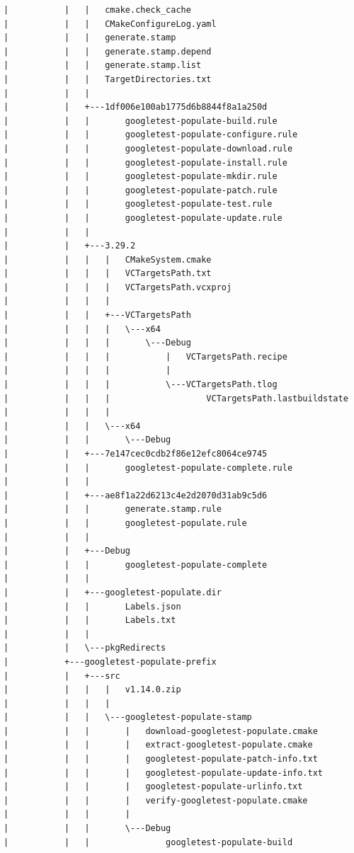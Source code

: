 \documentclass[12pt,a4paper]{article}
\begin{document}
\begin{verbatim}
|           |   |   cmake.check_cache
|           |   |   CMakeConfigureLog.yaml
|           |   |   generate.stamp
|           |   |   generate.stamp.depend
|           |   |   generate.stamp.list
|           |   |   TargetDirectories.txt
|           |   |   
|           |   +---1df006e100ab1775d6b8844f8a1a250d
|           |   |       googletest-populate-build.rule
|           |   |       googletest-populate-configure.rule
|           |   |       googletest-populate-download.rule
|           |   |       googletest-populate-install.rule
|           |   |       googletest-populate-mkdir.rule
|           |   |       googletest-populate-patch.rule
|           |   |       googletest-populate-test.rule
|           |   |       googletest-populate-update.rule
|           |   |       
|           |   +---3.29.2
|           |   |   |   CMakeSystem.cmake
|           |   |   |   VCTargetsPath.txt
|           |   |   |   VCTargetsPath.vcxproj
|           |   |   |   
|           |   |   +---VCTargetsPath
|           |   |   |   \---x64
|           |   |   |       \---Debug
|           |   |   |           |   VCTargetsPath.recipe
|           |   |   |           |   
|           |   |   |           \---VCTargetsPath.tlog
|           |   |   |                   VCTargetsPath.lastbuildstate
|           |   |   |                   
|           |   |   \---x64
|           |   |       \---Debug
|           |   +---7e147cec0cdb2f86e12efc8064ce9745
|           |   |       googletest-populate-complete.rule
|           |   |       
|           |   +---ae8f1a22d6213c4e2d2070d31ab9c5d6
|           |   |       generate.stamp.rule
|           |   |       googletest-populate.rule
|           |   |       
|           |   +---Debug
|           |   |       googletest-populate-complete
|           |   |       
|           |   +---googletest-populate.dir
|           |   |       Labels.json
|           |   |       Labels.txt
|           |   |       
|           |   \---pkgRedirects
|           +---googletest-populate-prefix
|           |   +---src
|           |   |   |   v1.14.0.zip
|           |   |   |   
|           |   |   \---googletest-populate-stamp
|           |   |       |   download-googletest-populate.cmake
|           |   |       |   extract-googletest-populate.cmake
|           |   |       |   googletest-populate-patch-info.txt
|           |   |       |   googletest-populate-update-info.txt
|           |   |       |   googletest-populate-urlinfo.txt
|           |   |       |   verify-googletest-populate.cmake
|           |   |       |   
|           |   |       \---Debug
|           |   |               googletest-populate-build

\end{verbatim}
\end{document}

